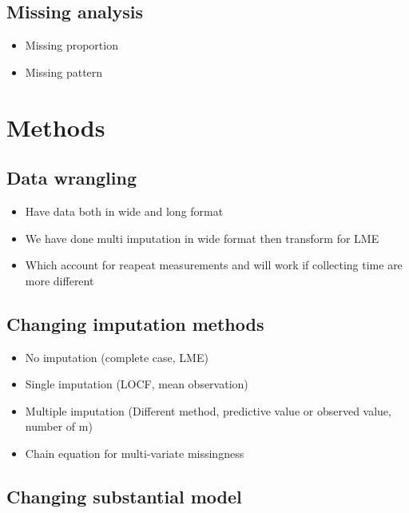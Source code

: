 \documentclass{article}
\providecommand{\tightlist}{%
  \setlength{\itemsep}{0pt}\setlength{\parskip}{0pt}}
\begin{document}
\subsection{Missing analysis}\label{missing-analysis}

\begin{itemize}
\tightlist
\item
  Missing proportion
\item
  Missing pattern
\end{itemize}

\section{Methods}\label{methods}

\subsection{Data wrangling}\label{data-wrangling}

\begin{itemize}
\tightlist
\item
  Have data both in wide and long format
\item
  We have done multi imputation in wide format then transform for LME
\item
  Which account for reapeat measurements and will work if collecting
  time are more different
\end{itemize}

\subsection{Changing imputation
methods}\label{changing-imputation-methods}

\begin{itemize}
\tightlist
\item
  No imputation (complete case, LME)
\item
  Single imputation (LOCF, mean observation)
\item
  Multiple imputation (Different method, predictive value or observed
  value, number of m)
\item
  Chain equation for multi-variate missingness
\end{itemize}

\subsection{Changing substantial
model}\label{changing-substantial-model}
\end{document}
